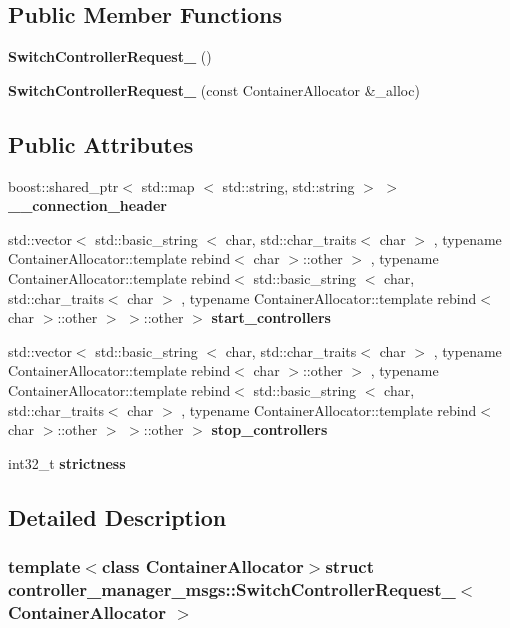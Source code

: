\subsection*{\-Public \-Member \-Functions}
\begin{DoxyCompactItemize}
\item 
{\bf \-Switch\-Controller\-Request\-\_\-} ()
\item 
{\bf \-Switch\-Controller\-Request\-\_\-} (const \-Container\-Allocator \&\-\_\-alloc)
\end{DoxyCompactItemize}
\subsection*{\-Public \-Attributes}
\begin{DoxyCompactItemize}
\item 
boost\-::shared\-\_\-ptr$<$ std\-::map\*
$<$ std\-::string, std\-::string $>$ $>$ {\bf \-\_\-\-\_\-connection\-\_\-header}
\item 
std\-::vector$<$ std\-::basic\-\_\-string\*
$<$ char, std\-::char\-\_\-traits$<$ char $>$\*
, typename \*
\-Container\-Allocator\-::template \*
rebind$<$ char $>$\-::other $>$\*
, typename \*
\-Container\-Allocator\-::template \*
rebind$<$ std\-::basic\-\_\-string\*
$<$ char, std\-::char\-\_\-traits$<$ char $>$\*
, typename \*
\-Container\-Allocator\-::template \*
rebind$<$ char $>$\-::other $>$\*
 $>$\-::other $>$ {\bf start\-\_\-controllers}
\item 
std\-::vector$<$ std\-::basic\-\_\-string\*
$<$ char, std\-::char\-\_\-traits$<$ char $>$\*
, typename \*
\-Container\-Allocator\-::template \*
rebind$<$ char $>$\-::other $>$\*
, typename \*
\-Container\-Allocator\-::template \*
rebind$<$ std\-::basic\-\_\-string\*
$<$ char, std\-::char\-\_\-traits$<$ char $>$\*
, typename \*
\-Container\-Allocator\-::template \*
rebind$<$ char $>$\-::other $>$\*
 $>$\-::other $>$ {\bf stop\-\_\-controllers}
\item 
int32\-\_\-t {\bf strictness}
\end{DoxyCompactItemize}


\subsection{\-Detailed \-Description}
\subsubsection*{template$<$class Container\-Allocator$>$struct controller\-\_\-manager\-\_\-msgs\-::\-Switch\-Controller\-Request\-\_\-$<$ Container\-Allocator $>$}



